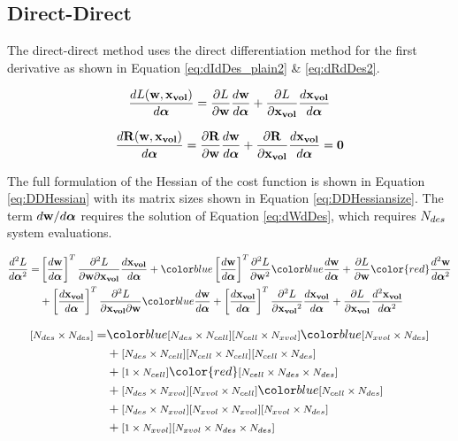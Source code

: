 \documentclass[letterpaper,12pt,]{article}
\begin{document}
\newpage
\subsection*{Direct-Direct}

The direct-direct method uses the direct differentiation method for the first derivative as shown in Equation \ref{eq:dIdDes_plain2} \& \ref{eq:dRdDes2}.

\begin{equation}
	\dfrac{dL( \mathbf{w}, \mathbf{x_{vol}} ) }{d\boldsymbol{\alpha}}
	= 
    \dfrac{\partial L}{\partial\mathbf{w}}
	\dfrac{d\mathbf{w}}{d\boldsymbol{\alpha}}
	+
	\dfrac{\partial L}{\partial\mathbf{x_{vol}}}
	\dfrac{d\mathbf{x_{vol}}}{d\boldsymbol{\alpha}}
	\label{eq:dIdDes_plain2}
\end{equation}

\begin{equation}
	\dfrac{d\mathbf{R}( \mathbf{w}, \mathbf{x_{vol}} ) }{d\boldsymbol{\alpha}}
	= 
    \dfrac{\partial\mathbf{R}}{\partial\mathbf{w}}
	\dfrac{d\mathbf{w}}{d\boldsymbol{\alpha}}
	+
	\dfrac{\partial\mathbf{R}}{\partial\mathbf{x_{vol}}}
	\dfrac{d\mathbf{x_{vol}}}{d\boldsymbol{\alpha}}
	= \mathbf{0}
	\label{eq:dRdDes2}
\end{equation}

The full formulation of the Hessian of the cost function is shown in Equation \ref{eq:DDHessian} with its matrix sizes shown in Equation \ref{eq:DDHessiansize}.
The term $d\mathbf{w}/d\boldsymbol{\alpha}$ requires the solution of Equation \ref{eq:dWdDes}, which requires $N_{des}$ system evaluations.

\begin{equation}
\begin{split}
	\DDt{L}{\balfa} 
	=&
	\trans{\Dt{\bw}{\balfa}}
	\ddelm{L}{\bw}{\xvol}
	\Dt{\xvol}{\balfa}
	+
	\blue{\trans{\Dt{\bw}{\balfa}}}
	\ddel{L}{\bw}
	\blue{\Dt{\bw}{\balfa}}
	+
	\del{L}{\bw}
	{\color{red}\DDt{\bw}{\balfa}}
	\\
	&+
	\trans{\Dt{\xvol}{\balfa}}
	\ddelm{L}{\xvol}{\bw}
	\blue{\Dt{\bw}{\balfa}}
	+
	\trans{\Dt{\xvol}{\balfa}}
	\ddel{L}{\xvol}
	\Dt{\xvol}{\balfa}
	+
	\del{L}{\xvol}
	\DDt{\xvol}{\balfa}
\label{eq:DDHessian}
\end{split}
\end{equation}

\begin{equation}
\begin{split}
	\nxn{\ndes}{\ndes}
	=
	&
	\blue{\nxn{\ndes}{\ncell}}
	\nxn{\ncell}{\nxvol}
	\blue{\nxn{\nxvol}{\ndes}}
	\\&
	+
	\nxn{\ndes}{\ncell}
	\nxn{\ncell}{\ncell}
	\nxn{\ncell}{\ndes}
	\\&
	+
	\nxn{1}{\ncell}
	{\color{red}\nxnxn{\ncell}{\ndes}{\ndes}}
	\\&
	+
	\nxn{\ndes}{\nxvol}
	\nxn{\nxvol}{\ncell}
	\blue{\nxn{\ncell}{\ndes}}
	\\&
	+
	\nxn{\ndes}{\nxvol}
	\nxn{\nxvol}{\nxvol}
	\nxn{\nxvol}{\ndes}
	\\&
	+
	\nxn{1}{\nxvol}
	\nxnxn{\nxvol}{\ndes}{\ndes}
\label{eq:DDHessiansize}
\end{split}
\end{equation}
\end{document}
